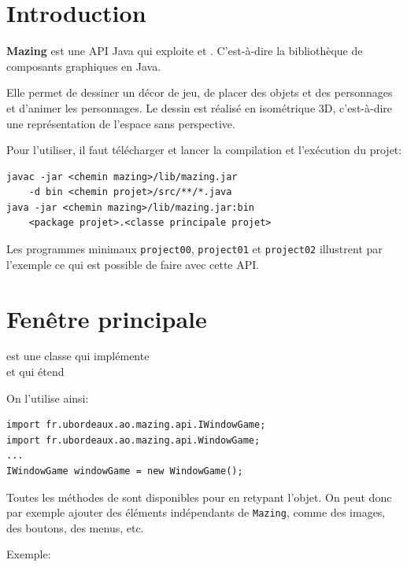 \documentclass[11pt]{article}
\begin{document}

\section*{Introduction}

\textbf{Mazing} est une API Java qui exploite  et . C'est-à-dire 
la bibliothèque de composants graphiques en Java.

Elle permet de dessiner un décor de jeu, de placer des objets et des personnages et d'animer les personnages.
Le dessin est réalisé en isométrique 3D, c'est-à-dire une représentation de l'espace sans perspective.

Pour l'utiliser, il faut télécharger  et lancer la compilation et l'exécution du projet:

\begin{lstlisting}[]
javac -jar <chemin mazing>/lib/mazing.jar 
    -d bin <chemin projet>/src/**/*.java
java -jar <chemin mazing>/lib/mazing.jar:bin 
    <package projet>.<classe principale projet>
\end{lstlisting}

Les programmes minimaux \texttt{project00}, \texttt{project01} et \texttt{project02} illustrent par 
l'exemple ce qui est possible de faire avec cette API.

\section*{Fenêtre principale}

 est une classe qui implémente\\ 
 et qui étend 

On l'utilise ainsi:
\begin{lstlisting}[]
import fr.ubordeaux.ao.mazing.api.IWindowGame;
import fr.ubordeaux.ao.mazing.api.WindowGame;
...
IWindowGame windowGame = new WindowGame();
\end{lstlisting}

Toutes les méthodes de  sont disponibles pour  en retypant l'objet. 
On peut donc par exemple ajouter des éléments indépendants de \texttt{Mazing}, comme des images, des boutons, des menus, etc.

Exemple:
\end{document}

